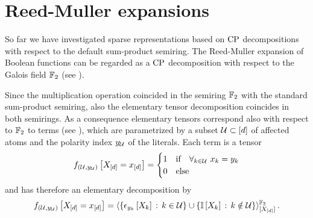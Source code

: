 \section{Reed-Muller expansions}\label{sec:reedMullerExpansion}

So far we have investigated sparse representations based on $\mathrm{CP}$ decompositions with respect to the default sum-product semiring.
The Reed-Muller expansion of Boolean functions \cite{muller_application_1954,reed_class_1954} can be regarded as a $\mathrm{CP}$ decomposition with respect to the Galois field $\mathbb{F}_2$ (see ).

Since the multiplication operation coincided in the semiring $\mathbb{F}_2$ with the standard sum-product semiring, also the elementary tensor decomposition coincides in both semirings.
As a consequence elementary tensors correspond also with respect to $\mathbb{F}_2$ to terms (see ), which are parametrized by a subset $\mathcal{U}\subset[d]$ of affected atoms and the polarity index $y_{\mathcal{U}}$ of the literals.
Each term is a tensor
\begin{align*}
    f_{(\mathcal{U},y_{\mathcal{U}})}\left[X_{[d]}=x_{[d]}\right]
    = \begin{cases}
          1 & \text{if}\quad \forall_{k\in\mathcal{U}} \,\, {x_{k}=y_{k}} \\
          0 & \text{else}
    \end{cases}
\end{align*}
and has therefore an elementary decomposition by
\begin{align*}
    f_{(\mathcal{U},y_{\mathcal{U}})}\left[X_{[d]}=x_{[d]}\right]
    = \langle
        \{\epsilon_{y_{k}}\left[X_{k}\right]\,:\,k\in\mathcal{U}\}
        \cup \{\mathbb{I}\left[X_{k}\right]\,:\,k\notin\mathcal{U}\}
    \rangle^{\mathbb{F}_2}_{[X_{[d]}]} \, .
\end{align*}

